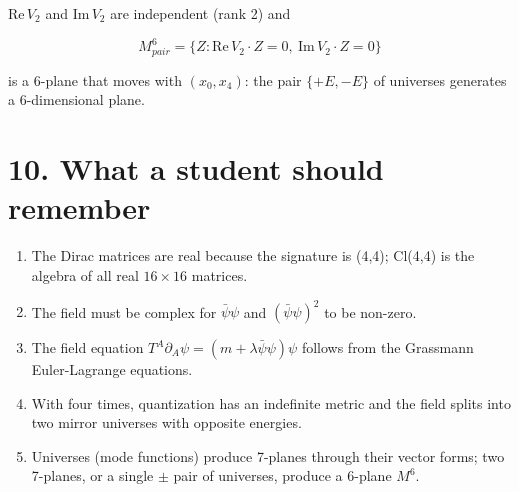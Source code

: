 \documentclass[10pt]{article}
\makeatletter
\newcommand\keepnext{\par\nopagebreak\@nobreaktrue\everypar{\@nobreakfalse\everypar{}}}
\makeatother
\begin{document}
$\mathrm{Re}\,V_2$ and $\mathrm{Im}\,V_2$ are independent (rank 2) and\keepnext


\[
M^6_{pair} = \{Z : \mathrm{Re}\,V_2\cdot Z = 0,\ \mathrm{Im}\,V_2\cdot Z = 0\}
\]

is a 6-plane that moves with $(x_0, x_4)$: the pair $\{+E, -E\}$ of universes generates a 6-dimensional plane.


\section*{10. What a student should remember}

\begin{enumerate}
\item The Dirac matrices are real because the signature is (4,4); Cl(4,4) is the algebra of all real $16\times16$ matrices.
\item The field must be complex for $\bar\psi\psi$ and $(\bar\psi\psi)^2$ to be non-zero.
\item The field equation $T^A\partial_A\psi = (m+\lambda\bar\psi\psi)\psi$ follows from the Grassmann Euler-Lagrange equations.
\item With four times, quantization has an indefinite metric and the field splits into two mirror universes with opposite energies.
\item Universes (mode functions) produce 7-planes through their vector forms; two 7-planes, or a single $\pm$ pair of universes, produce a 6-plane $M^6$.
\end{enumerate}
\end{document}
